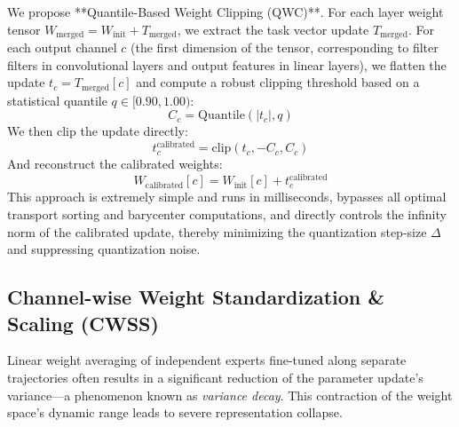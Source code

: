 \documentclass{article}
\theoremstyle{plain}
\theoremstyle{definition}
\theoremstyle{remark}
\begin{document}
We propose **Quantile-Based Weight Clipping (QWC)**. For each layer weight tensor $W_{\text{merged}} = W_{\text{init}} + T_{\text{merged}}$, we extract the task vector update $T_{\text{merged}}$. For each output channel $c$ (the first dimension of the tensor, corresponding to filter filters in convolutional layers and output features in linear layers), we flatten the update $t_c = T_{\text{merged}}[c]$ and compute a robust clipping threshold based on a statistical quantile $q \in [0.90, 1.00)$:
\begin{equation}
C_c = \text{Quantile}(|t_c|, q)
\end{equation}
We then clip the update directly:
\begin{equation}
t_c^{\text{calibrated}} = \text{clip}(t_c, -C_c, C_c)
\end{equation}
And reconstruct the calibrated weights:
\begin{equation}
W_{\text{calibrated}}[c] = W_{\text{init}}[c] + t_c^{\text{calibrated}}
\end{equation}
This approach is extremely simple and runs in milliseconds, bypasses all optimal transport sorting and barycenter computations, and directly controls the infinity norm of the calibrated update, thereby minimizing the quantization step-size $\Delta$ and suppressing quantization noise.

\subsection{Channel-wise Weight Standardization \& Scaling (CWSS)}
Linear weight averaging of independent experts fine-tuned along separate trajectories often results in a significant reduction of the parameter update's variance---a phenomenon known as \textit{variance decay}. This contraction of the weight space's dynamic range leads to severe representation collapse. 
\end{document}
